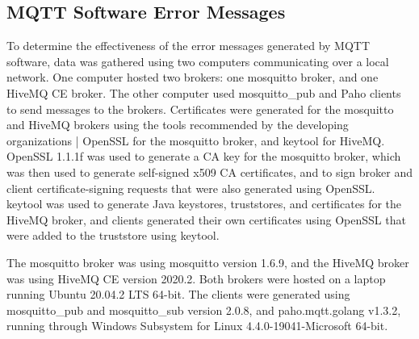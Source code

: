 \documentclass[12pt]{article}
\begin{document}
\subsection{MQTT Software Error Messages}
To determine the effectiveness of the error messages generated by MQTT software, data was gathered using two computers communicating over a local network. One computer hosted two brokers: one mosquitto broker, and one HiveMQ CE broker. The other computer used mosquitto\_pub and Paho clients to send messages to the brokers. Certificates were generated for the mosquitto and HiveMQ brokers using the tools recommended by the developing organizations | OpenSSL for the mosquitto broker, and keytool for HiveMQ. OpenSSL 1.1.1f was used to generate a CA key for the mosquitto broker, which was then used to generate self-signed x509 CA certificates, and to sign broker and client certificate-signing requests that were also generated using OpenSSL. keytool was used to generate Java keystores, truststores, and certificates for the HiveMQ broker, and clients generated their own certificates using OpenSSL that were added to the truststore using keytool.\par
The mosquitto broker was using mosquitto version 1.6.9, and the HiveMQ broker was using HiveMQ CE version 2020.2. Both brokers were hosted on a laptop running Ubuntu 20.04.2 LTS 64-bit. The clients were generated using mosquitto\_pub and mosquitto\_sub version 2.0.8, and paho.mqtt.golang v1.3.2, running through Windows Subsystem for Linux 4.4.0-19041-Microsoft 64-bit.\par
\end{document}
